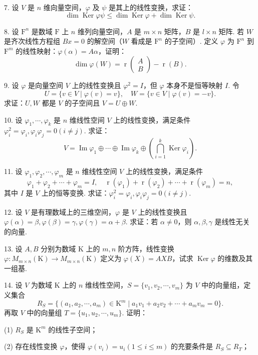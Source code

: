 \documentclass[UTF8, 12pt, fontset=fandol, oneside]{ctexart}
\begin{document}
7. 设 $V$ 是 $n$ 维向量空间，$\varphi$ 及 $\psi$ 是其上的线性变换，求证：
\[
\dim\operatorname{Ker}\varphi\psi\le\dim\operatorname{Ker}\varphi+\dim\operatorname{Ker}\psi.
\]

8. 设 $\mathrm{F}^n$ 是数域 $\mathrm{F}$ 上 $n$ 维列向量空间，$A$ 是 $m\times n$ 矩阵，$B$ 是 $l\times n$ 矩阵. 若 $W$ 是齐次线性方程组 $Bx=0$ 的解空间（$W$ 看成是 $\mathrm{F}^n$ 的子空间）. 定义 $\varphi$ 为 $\mathrm{F}^n$ 到 $\mathrm{F}^m$ 的线性映射：$\varphi(\alpha)=A\alpha$，证明：
\[
\dim\varphi(W)=\operatorname{r}\left(\begin{array}{c}A\\B\end{array}\right)-\operatorname{r}(B).
\]

9. 设 $\varphi$ 是向量空间 $V$ 上的线性变换且 $\varphi^2=I$，但 $\varphi$ 本身不是恒等映射 $I$. 令
\[
U=\{v\in V\mid \varphi(v)=v\},\quad W=\{v\in V\mid \varphi(v)=-v\}.
\]
求证：$U,W$ 都是 $V$ 的子空间且 $V=U\oplus W$.

10. 设 $\varphi_1,\cdots,\varphi_k$ 是 $n$ 维线性空间 $V$ 上的线性变换，满足条件 $\varphi_i^2=\varphi_i,\varphi_i\varphi_j=0(i\ne j)$. 求证：
\[
V=\operatorname{Im}\varphi_1\oplus\cdots\oplus\operatorname{Im}\varphi_k\oplus\left(\bigcap_{i=1}^k\operatorname{Ker}\varphi_i\right).
\]

11. 设 $\varphi_1,\varphi_2,\cdots,\varphi_m$ 是 $n$ 维线性空间 $V$ 上的线性变换，满足条件
\[
\varphi_1+\varphi_2+\cdots+\varphi_m=I,\quad
\operatorname{r}(\varphi_1)+\operatorname{r}(\varphi_2)+\cdots+\operatorname{r}(\varphi_m)=n,
\]
其中 $I$ 是 $V$ 上的恒等变换. 求证：$\varphi_i^2=\varphi_i,\varphi_i\varphi_j=0(i\ne j)$.

12. 设 $V$ 是有理数域上的三维空间，$\varphi$ 是 $V$ 上的线性变换且 $\varphi(\alpha)=\beta,\varphi(\beta)=\gamma,\varphi(\gamma)=\alpha+\beta$. 求证：若 $\alpha\ne0$，则 $\alpha,\beta,\gamma$ 是线性无关的向量.

13. 设 $A,B$ 分别为数域 $\mathrm{K}$ 上的 $m,n$ 阶方阵，线性变换 $\varphi:M_{m\times n}(\mathrm{K})\to M_{m\times n}(\mathrm{K})$ 定义为 $\varphi(X)=AXB$，试求 $\operatorname{Ker}\varphi$ 的维数及其一组基.

14. 设 $V$ 为数域 $\mathrm{K}$ 上的 $n$ 维线性空间，$S=\{v_1,v_2,\cdots,v_m\}$ 为 $V$ 中的向量组，定义集合
\[
R_S=\{(a_1,a_2,\cdots,a_m)\in\mathrm{K}^m\mid a_1v_1+a_2v_2+\cdots+a_mv_m=0\}.
\]
再取 $V$ 中的向量组 $T=\{u_1,u_2,\cdots,u_m\}$. 证明：

(1) $R_S$ 是 $\mathrm{K}^m$ 的线性子空间；

(2) 存在线性变换 $\varphi$，使得 $\varphi(v_i)=u_i(1\le i\le m)$ 的充要条件是 $R_S\subseteq R_T$；
\end{document}
